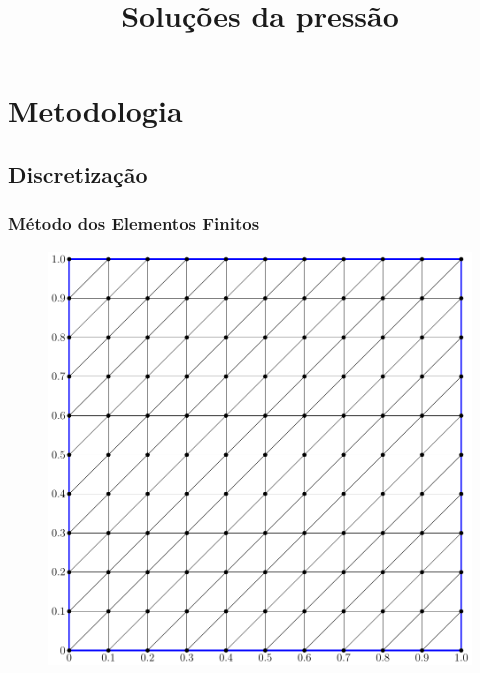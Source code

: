\documentclass{beamer}
\begin{document}
\section{Metodologia}

\subsection{Discretização}
\begin{frame}
  \frametitle{Método dos Elementos Finitos}
  
  \begin{figure}
    \title{Soluções da pressão}
    \begin{minipage}[t]{.49\textwidth}
      \centering
      \includegraphics[height=0.95\linewidth]{figure/structured_mesh.pdf}
    \end{minipage}
    \hfill
    \begin{minipage}[t]{.49\textwidth}
      \centering

\end{minipage}
\end{figure}
\end{frame}
\end{document}
